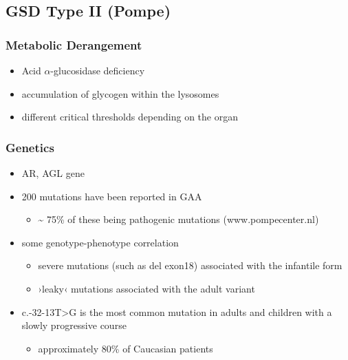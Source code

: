 \documentclass{scrartcl}
\begin{document}
\subsection{GSD Type II (Pompe)}
\label{sec:org8359bdb}
\subsubsection{Metabolic Derangement}
\label{sec:org9af2c6d}
\begin{itemize}
\item Acid \(\alpha\)-glucosidase deficiency
\item accumulation of glycogen within the lysosomes
\item different critical thresholds depending on the organ
\end{itemize}

\subsubsection{Genetics}
\label{sec:org3e82301}
\begin{itemize}
\item AR, AGL gene
\item 200 mutations have been reported in GAA
\begin{itemize}
\item \textasciitilde{} 75\% of these being pathogenic mutations (www.pompecenter.nl)
\end{itemize}
\item some genotype-phenotype correlation
\begin{itemize}
\item severe mutations (such as del exon18) associated with the infantile form
\item ›leaky‹ mutations associated with the adult variant
\end{itemize}
\item c.-32-13T>G is the most common mutation in adults and children with
a slowly progressive course
\begin{itemize}
\item approximately 80\% of Caucasian patients
\end{itemize}
\end{itemize}
\end{document}
